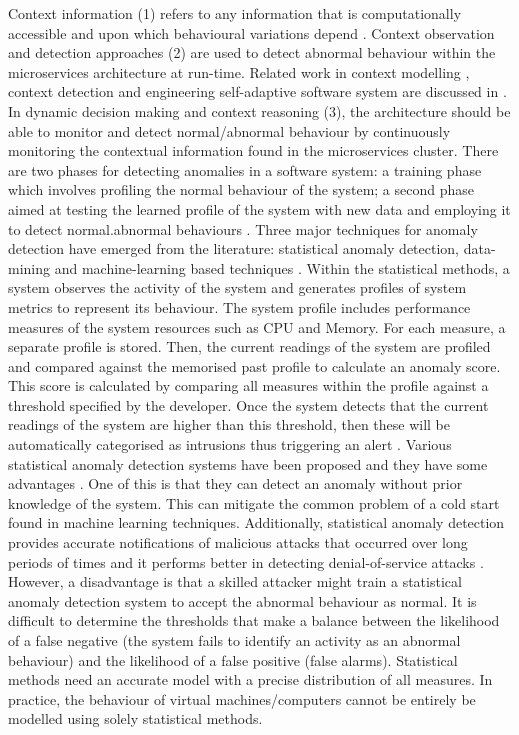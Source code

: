 \documentclass[sigconf]{acmart}
\begin{document}
Context information (1) refers to any information that is computationally accessible and upon which behavioural variations depend \cite{Hirschfeld:2008p1620}. Context observation and detection approaches (2) are used to detect abnormal behaviour within the microservices architecture at run-time. Related work in context modelling \cite{Strang:2004p3770}, context detection and engineering self-adaptive software system are discussed in \cite{Salehie:2009p3693,Cheng:2008p3708,RogeriodeLemos:2011tj}.  
In dynamic decision making and context reasoning (3), the architecture should be able to monitor and detect normal/abnormal behaviour by continuously monitoring the contextual information found in the microservices cluster. There are two phases for detecting anomalies in a software system: a training phase which involves profiling the normal behaviour of the system; a second phase aimed at testing the learned profile of the system with new data and employing it to detect normal.abnormal behaviours \cite{Patcha:2007hja}. Three major techniques for anomaly detection have emerged from the literature: statistical anomaly detection, data-mining and machine-learning based techniques \cite{Patcha:2007hja}. 
Within the statistical methods, a system observes the activity of the system and generates profiles of  system metrics to represent its behaviour. The system profile includes performance measures of the system resources such as CPU and Memory. For each measure, a separate profile is stored. Then, the current readings of the system are profiled and compared against the memorised past profile to calculate an anomaly score. This score is calculated by comparing all measures within the profile against a threshold specified by the developer. Once the system detects that the current readings of the system  are higher than this threshold, then these will be automatically categorised as  intrusions thus triggering an alert \cite{manikopoulos2002network,kruegel2003anomaly}. 
Various statistical anomaly detection systems have been proposed and they have some advantages \cite{lunt1992real,denning1985requirements,anderson1995next,roesch1999snort,maxion1990case}. 
One of this is that they can detect an anomaly without prior knowledge of the system. This can mitigate the common problem of a cold start found in machine learning techniques. Additionally, statistical anomaly detection provides accurate notifications of malicious attacks that occurred over long periods of times and it performs better in detecting denial-of-service attacks \cite{Patcha:2007hja}. 
However, a disadvantage is that a skilled attacker might train a statistical anomaly detection system to accept the abnormal behaviour as normal. It is difficult to determine the thresholds that make a balance between the likelihood of a false negative (the system fails to identify an activity as an abnormal behaviour) and the likelihood of a false positive (false alarms). Statistical methods need an accurate  model with a precise distribution of all measures. In practice, the behaviour of virtual machines/computers cannot be entirely be modelled using solely statistical methods.
\end{document}
